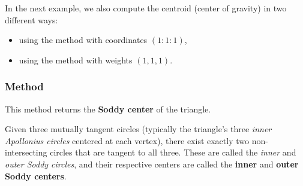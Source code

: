 \medskip

In the next example, we also compute the centroid (center of gravity) in two different ways:
\begin{itemize}
  \item using the  method with coordinates $(1:1:1)$,
  \item using the  method with weights $(1,1,1)$.
\end{itemize}

\vspace{1em}

\begin{minipage}{.5\textwidth}
\begin{center}
\end{center}
\end{minipage}
\begin{minipage}{.5\textwidth}
\begin{tkzexample}
\end{tkzexample}
\end{minipage}

\subsubsection{Method }
\label{ssub:method_triangle_soddy_center}

This method returns the \textbf{Soddy center} of the triangle.

\medskip

Given three mutually tangent circles (typically the triangle’s three \emph{inner Apollonius circles} centered at each vertex), there exist exactly two non-intersecting circles that are tangent to all three. These are called the \emph{inner} and \emph{outer Soddy circles}, and their respective centers are called the \textbf{inner} and \textbf{outer Soddy centers}.

